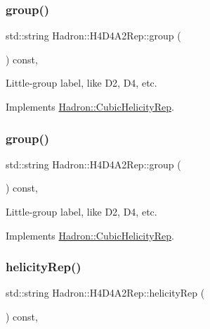 \subsubsection{\texorpdfstring{group()}{group()}\hspace{0.1cm}{\footnotesize\ttfamily [2/3]}}
{\footnotesize\ttfamily std\+::string Hadron\+::\+H4\+D4\+A2\+Rep\+::group (\begin{DoxyParamCaption}{ }\end{DoxyParamCaption}) const\hspace{0.3cm}{\ttfamily [inline]}, {\ttfamily [virtual]}}

Little-\/group label, like D2, D4, etc. 

Implements \mbox{\hyperlink{structHadron_1_1CubicHelicityRep_a101a7d76cd8ccdad0f272db44b766113}{Hadron\+::\+Cubic\+Helicity\+Rep}}.

\mbox{\label{structHadron_1_1H4D4A2Rep_a84c4465f2963fe5e6d241882ff28ddae}} 
\subsubsection{\texorpdfstring{group()}{group()}\hspace{0.1cm}{\footnotesize\ttfamily [3/3]}}
{\footnotesize\ttfamily std\+::string Hadron\+::\+H4\+D4\+A2\+Rep\+::group (\begin{DoxyParamCaption}{ }\end{DoxyParamCaption}) const\hspace{0.3cm}{\ttfamily [inline]}, {\ttfamily [virtual]}}

Little-\/group label, like D2, D4, etc. 

Implements \mbox{\hyperlink{structHadron_1_1CubicHelicityRep_a101a7d76cd8ccdad0f272db44b766113}{Hadron\+::\+Cubic\+Helicity\+Rep}}.

\mbox{\label{structHadron_1_1H4D4A2Rep_a6f131b590922aebb01c15d0f9a0b9d1b}} 
\subsubsection{\texorpdfstring{helicityRep()}{helicityRep()}\hspace{0.1cm}{\footnotesize\ttfamily [1/2]}}
{\footnotesize\ttfamily std\+::string Hadron\+::\+H4\+D4\+A2\+Rep\+::helicity\+Rep (\begin{DoxyParamCaption}{ }\end{DoxyParamCaption}) const\hspace{0.3cm}{\ttfamily [inline]}, {\ttfamily [virtual]}}

